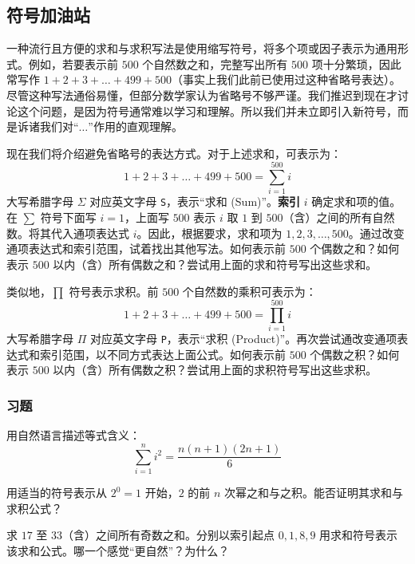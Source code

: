 \subsection{符号加油站}\label{sec:section1.3.5}

一种流行且方便的求和与求积写法是使用缩写符号，将多个项或因子表示为通用形式。例如，若要表示前 $500$ 个自然数之和，完整写出所有 $500$ 项十分繁琐，因此常写作 $1+2+3+\dots+499+500$（事实上我们此前已使用过这种省略号表达）。尽管这种写法通俗易懂，但部分数学家认为省略号不够严谨。我们推迟到现在才讨论这个问题，是因为符号通常难以学习和理解。所以我们并未立即引入新符号，而是诉诸我们对``$\dots$''作用的直观理解。

现在我们将介绍避免省略号的表达方式。对于上述求和，可表示为：
\[1+2+3+\dots+499+500 = \sum_{i=1}^{500}i\]
大写希腊字母 $\Sigma$ 对应英文字母 \verb|S|，表示``求和 (Sum)''。\textbf{索引} $i$ 确定求和项的值。在 $\sum$ 符号下面写 $i = 1$，上面写 $500$ 表示 $i$ 取 $1$ 到 $500$（含）之间的所有自然数。将其代入通项表达式 $i$。因此，根据要求，求和项为 $1,2,3,\dots,500$。通过改变通项表达式和索引范围，试着找出其他写法。如何表示前 $500$ 个偶数之和？如何表示 $500$ 以内（含）所有偶数之和？尝试用上面的求和符号写出这些求和。

类似地，$\prod$ 符号表示求积。前 $500$ 个自然数的乘积可表示为：
\[1+2+3+\dots+499+500 = \prod_{i=1}^{500}i\]
大写希腊字母 $\Pi$ 对应英文字母 \verb|P|，表示``求积 (Product)''。再次尝试通改变通项表达式和索引范围，以不同方式表达上面公式。如何表示前 $500$ 个偶数之积？如何表示 $500$ 以内（含）所有偶数之积？尝试用上面的求积符号写出这些求积。

\subsubsection*{习题}

\begin{problem}
    用自然语言描述等式含义：
    \[\sum_{i=1}^{n}i^2 = \frac{n(n+1)(2n+1)}{6}\]
\end{problem}
\begin{problem}
    用适当的符号表示从 $2^0=1$ 开始，$2$ 的前 $n$ 次幂之和与之积。能否证明其求和与求积公式？
\end{problem}
\begin{problem}
    求 $17$ 至 $33$（含）之间所有奇数之和。分别以索引起点 $0,1,8,9$ 用求和符号表示该求和公式。哪一个感觉``更自然''？为什么？
\end{problem}